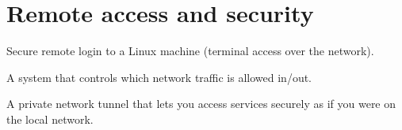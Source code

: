 \section*{Remote access and security}

\begin{description}[leftmargin=!,labelwidth=4cm]
  \item[SSH] Secure remote login to a Linux machine (terminal access over the network).
  \item[Firewall] A system that controls which network traffic is allowed in/out.
  \item[VPN] A private network tunnel that lets you access services securely as if you were on the local network.
\end{description} 